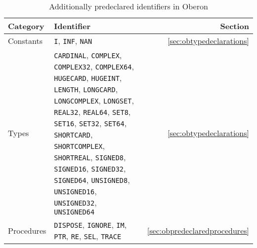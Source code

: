 \begin{itemize}
\begin{table}
\centering
\begin{tabular}{@{}lp{}r@{}}
\toprule Category & Identifier & Section \\
\midrule Constants & \texttt{I}, \texttt{INF}, \texttt{NAN} & \ref{sec:obtypedeclarations} \\
\midrule Types & \texttt{CARDINAL}, \texttt{COMPLEX}, \texttt{COMPLEX32}, \texttt{COMPLEX64}, \texttt{HUGECARD}, \texttt{HUGEINT}, \texttt{LENGTH}, \texttt{LONGCARD}, \texttt{LONGCOMPLEX}, \texttt{LONGSET}, \texttt{REAL32}, \texttt{REAL64}, \texttt{SET8}, \texttt{SET16}, \texttt{SET32}, \texttt{SET64}, \texttt{SHORTCARD}, \texttt{SHORTCOMPLEX}, \texttt{SHORTREAL}, \texttt{SIGNED8}, \texttt{SIGNED16}, \texttt{SIGNED32}, \texttt{SIGNED64}, \texttt{UNSIGNED8}, \texttt{UNSIGNED16}, \texttt{UNSIGNED32}, \texttt{UNSIGNED64} & \ref{sec:obtypedeclarations} \\
\midrule Procedures & \texttt{DISPOSE}, \texttt{IGNORE}, \texttt{IM}, \texttt{PTR}, \texttt{RE}, \texttt{SEL}, \texttt{TRACE} & \ref{sec:obpredeclaredprocedures} \\
\bottomrule
\end{tabular}
\caption{Additionally predeclared identifiers in Oberon}
\label{tab:obpredeclaredidentifiers}
\end{table}

\end{itemize}

\label{sec:obtypedeclarations}

